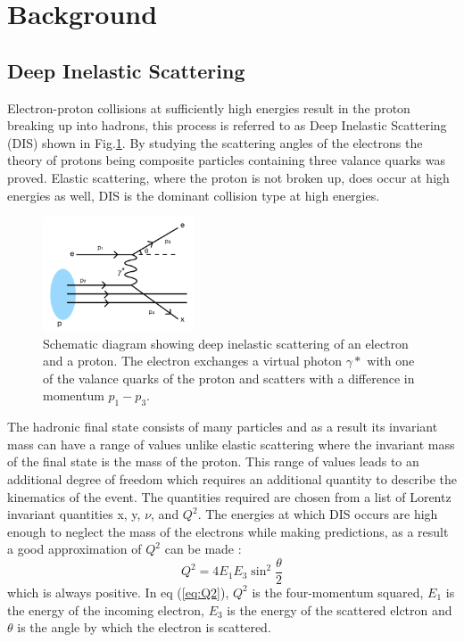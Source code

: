 \documentclass[journal, a4paper,10pt]{IEEEtran}
\begin{document}
\section{Background}

\subsection*{\textbf{Deep Inelastic Scattering}}

Electron-proton collisions at sufficiently high energies result in the proton breaking up into hadrons, this process is referred to as Deep Inelastic Scattering (DIS) shown in Fig.\ref{fig:DIS}. By studying the scattering angles of the electrons the theory of protons being composite particles containing three valance quarks was proved. Elastic scattering, where the proton is not broken up, does occur at high energies as well, DIS is the dominant collision type at high energies.

\begin{figure}[!h]
	\centering
		\includegraphics[width =0.4\textwidth]{DIS.png}
		\caption{Schematic diagram showing deep inelastic scattering of an electron and a proton. The electron exchanges a virtual photon $\gamma *$ with one of the valance quarks of the proton and scatters with a difference in momentum $p_1 - p_3$.}
		\label{fig:DIS}
\end{figure}

The hadronic final state consists of many particles and as a result its invariant mass can have a range of values unlike elastic scattering where the invariant mass of the final state is the mass of the proton. This range of values leads to an additional degree of freedom which requires an additional quantity to describe the kinematics of the event. The quantities required are chosen from a list of Lorentz invariant quantities x, y, $\nu$, and $Q^2$. 
The energies at which DIS occurs are high enough to neglect the mass of the electrons while making predictions, as a result a good approximation of $Q^2$ can be made \cite{Modern}:
\begin{equation}
	Q^2 = 4E_1E_3 \sin ^2\frac{\theta}{2}
	\label{eq:Q2}
\end{equation}
which is always positive. In eq (\ref{eq:Q2}), $Q^2$ is the four-momentum squared, $E_1$ is the energy of the incoming electron, $E_3$ is the energy of the scattered elctron and $\theta$ is the angle by which the electron is scattered.
\end{document}
